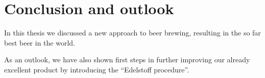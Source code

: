 \chapter{Conclusion and outlook}
\label{chap:conclusion}

In this thesis we discussed a new approach to beer brewing,
resulting in the so far best beer in the world.

As an outlook, we have also shown first steps in further improving
our already excellent product by introducing the ``Edelstoff procedure''.
